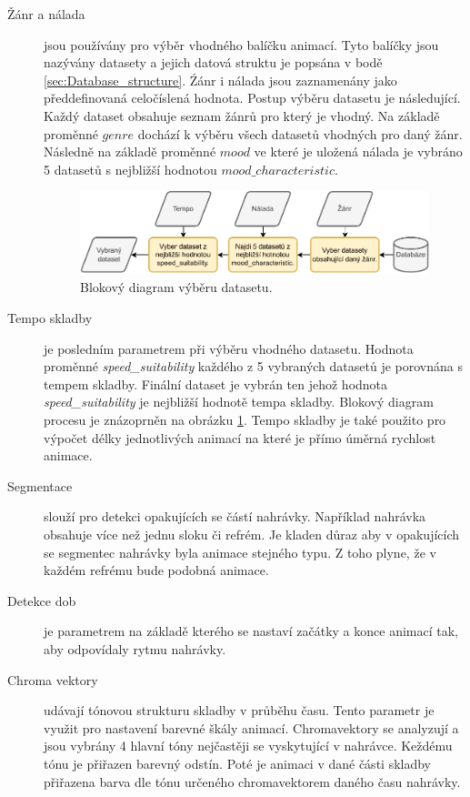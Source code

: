 \begin{description}
    \item[Žánr a nálada] jsou používány pro výběr vhodného balíčku animací. Tyto balíčky jsou nazývány datasety a jejich datová struktu je popsána v bodě \ref{sec:Database_structure}. Źánr i nálada jsou zaznamenány jako předdefinovaná celočíslená hodnota. Postup výběru datasetu je následující. Každý dataset obsahuje seznam žánrů pro který je vhodný. Na základě proměnné $genre$ dochází k výběru všech datasetů vhodných pro daný žánr. Následně na základě proměnné $mood$ ve které je uložená nálada je vybráno 5 datasetů s nejbližší hodnotou $mood\_characteristic$.
    
    \begin{figure}[H]
        \centering
        \includegraphics[width = 1\linewidth]{obrazky/Dataset_selection_diagram.pdf}
        \caption{Blokový diagram výběru datasetu.}
        \label{fig:Dataset_selection_diagram}
    \end{figure}

    \item[Tempo skladby] je posledním parametrem při výběru vhodného datasetu. 
    Hodnota proměnné \textit{speed\_suitability} každého z 5 vybraných datasetů je porovnána s tempem skladby. Finální dataset je vybrán ten jehož hodnota \textit{speed\_suitability} je nejbližší hodnotě tempa skladby. Blokový diagram procesu je znázoprněn na obrázku \ref{fig:Dataset_selection_diagram}. Tempo skladby je také použito pro výpočet délky jednotlivých animací na které je přímo úměrná rychlost animace.
    \item[Segmentace] slouží pro detekci opakujících se částí nahrávky. Například nahrávka obsahuje více než jednu sloku či refrém. Je kladen důraz aby v opakujících se segmentec nahrávky byla animace stejného typu. Z toho plyne, že v každém refrému bude podobná animace.
    \item[Detekce dob] je parametrem na základě kterého se nastaví začátky a konce animací tak, aby odpovídaly rytmu nahrávky.
    \item[Chroma vektory] udávají tónovou strukturu skladby v průběhu času. Tento parametr je využit pro nastavení barevné škály animací. Chromavektory se analyzují a jsou vybrány 4 hlavní tóny nejčastěji se vyskytující v nahrávce. Keždému tónu je přiřazen barevný odstín. Poté je animaci v dané části skladby přiřazena barva dle tónu určeného chromavektorem daného času nahrávky.


\end{description}
